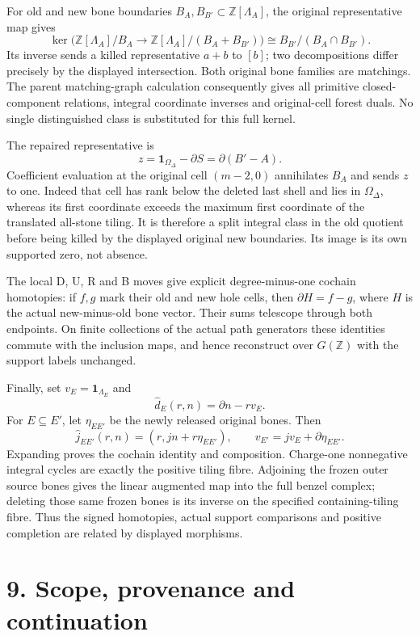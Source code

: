 For old and new bone boundaries
\(B_A,B_{B'}\subset\mathbb Z[\Lambda_A]\), the original representative
map gives \[
\ker\bigl(\mathbb Z[\Lambda_A]/B_A\to\mathbb Z[\Lambda_A]/(B_A+B_{B'})\bigr)
\cong B_{B'}/(B_A\cap B_{B'}).
\] Its inverse sends a killed representative \(a+b\) to \([b]\); two
decompositions differ precisely by the displayed intersection. Both
original bone families are matchings. The parent matching-graph
calculation consequently gives all primitive closed-component relations,
integral coordinate inverses and original-cell forest duals. No single
distinguished class is substituted for this full kernel.

The repaired representative is \[
z=\mathbf1_{\Omega_\Delta}-\partial S=\partial(B'-A).
\] Coefficient evaluation at the original cell \((m-2,0)\) annihilates
\(B_A\) and sends \(z\) to one. Indeed that cell has rank below the
deleted last shell and lies in \(\Omega_\Delta\), whereas its first
coordinate exceeds the maximum first coordinate of the translated
all-stone tiling. It is therefore a split integral class in the old
quotient before being killed by the displayed original new boundaries.
Its image is its own supported zero, not absence.

The local D, U, R and B moves give explicit degree-minus-one cochain
homotopies: if \(f,g\) mark their old and new hole cells, then
\(\partial H=f-g\), where \(H\) is the actual new-minus-old bone vector.
Their sums telescope through both endpoints. On finite collections of
the actual path generators these identities commute with the inclusion
maps, and hence reconstruct over \(G(\mathbb Z)\) with the support
labels unchanged.

Finally, set \(v_E=\mathbf1_{\Lambda_E}\) and \[
\widehat d_E(r,n)=\partial n-rv_E.
\] For \(E\subseteq E'\), let \(\eta_{EE'}\) be the newly released
original bones. Then \[
\widehat j_{EE'}(r,n)=(r,jn+r\eta_{EE'}),\qquad
v_{E'}=jv_E+\partial\eta_{EE'}.
\] Expanding proves the cochain identity and composition. Charge-one
nonnegative integral cycles are exactly the positive tiling fibre.
Adjoining the frozen outer source bones gives the linear augmented map
into the full benzel complex; deleting those same frozen bones is its
inverse on the specified containing-tiling fibre. Thus the signed
homotopies, actual support comparisons and positive completion are
related by displayed morphisms.

\section{9. Scope, provenance and
continuation}\label{scope-provenance-and-continuation}


